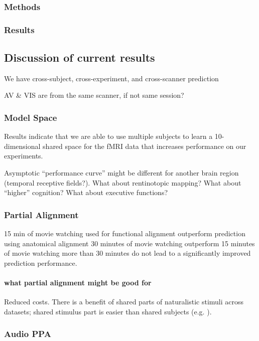 \subsubsection{Methods}

\subsubsection{Results}


\subsection{Discussion of current results}


We have cross-subject, cross-experiment, and cross-scanner prediction


AV \& VIS are from the same scanner, if not same session?

\subsubsection{Model Space}
%
Results indicate that we are able to use multiple subjects to learn a
10-dimensional shared space for the fMRI data that increases performance on our
experiments.

%
Asymptotic ``performance curve'' might be different for another brain region
(temporal receptive fields?).
%
What about rentinotopic mapping?
%
What about ``higher'' cognition?
%
What about executive functions?


\subsubsection{Partial Alignment}
%
15 min of movie watching used for functional alignment outperform prediction
using anatomical alignment
%
30 minutes of movie watching outperform 15 minutes of movie watching
%
more than 30 minutes do not lead to a significantly improved prediction
performance.


\paragraph{what partial alignment might be good for}
%
Reduced costs.
%
There is a benefit of shared parts of naturalistic stimuli across datasets;
shared stimulus part is easier than shared subjects (e.g.
\citep{zhang2018transfer}).


\subsubsection{Audio PPA}


